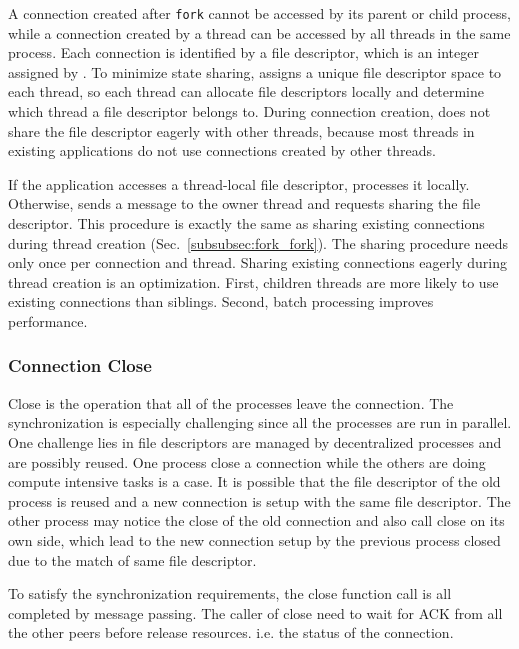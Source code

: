 A connection created after \texttt{fork} cannot be accessed by its parent or child process, while a connection created by a thread can be accessed by all threads in the same process. Each connection is identified by a file descriptor, which is an integer assigned by \libipc. To minimize state sharing, \libipc assigns a unique file descriptor space to each thread, so each thread can allocate file descriptors locally and determine which thread a file descriptor belongs to. During connection creation, \libipc does not share the file descriptor eagerly with other threads, because most threads in existing applications do not use connections created by other threads.

If the application accesses a thread-local file descriptor, \libipc processes it locally. Otherwise, \libipc sends a message to the owner thread and requests sharing the file descriptor. This procedure is exactly the same as sharing existing connections during thread creation (Sec.~\ref{subsubsec:fork_fork}). The sharing procedure needs only once per connection and thread. Sharing existing connections eagerly during thread creation is an optimization. First, children threads are more likely to use existing connections than siblings. Second, batch processing improves performance.

\subsubsection{Connection Close}
\label{subsubsec:fork_close}

Close is the operation that all of the processes leave the connection. The synchronization is  especially challenging since all the processes are run in parallel. One challenge lies in file descriptors are managed by decentralized processes and are possibly reused. One process close a connection while the others are doing compute intensive tasks is a case. It is possible that the file descriptor of the old process is reused and a new connection is setup with the same file descriptor. The other process may notice the close of the old connection and also call close on its own side, which lead to the new connection setup by the previous process closed due to the match of same file descriptor. 

To satisfy the synchronization requirements, the close function call is all completed by message passing. The caller of close need to wait for ACK from all the other peers before release resources. i.e. the status of the connection.

